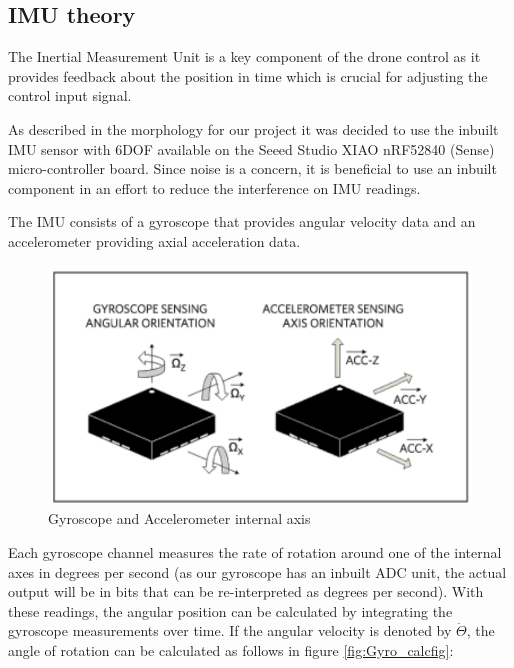 \subsection{IMU theory}

The Inertial Measurement Unit is a key component of the drone control as it provides feedback about the position in time which is crucial for adjusting the control input signal.

As described in the morphology for our project it was decided to use the inbuilt IMU sensor with 6DOF available on the Seeed Studio XIAO nRF52840 (Sense) micro-controller board. Since noise is a concern, it is beneficial to use an inbuilt component in an effort to reduce the interference on IMU readings.

The IMU consists of a gyroscope that provides angular velocity
data and an accelerometer providing axial acceleration data.

\begin{figure}[H]
    \begin{center}
    \includegraphics[scale = 0.5]{pictures/IMU/Gyro.png}
    \end{center}
    \caption{Gyroscope and Accelerometer internal axis \cite{IMU_basics}}
    \label{fig:my_label}
\end{figure}


Each gyroscope channel measures the rate of rotation around one of the internal axes in degrees per second (as our gyroscope has an inbuilt ADC unit, the actual output will be in bits that can be re-interpreted as degrees per second). With these readings, the angular position can be calculated by integrating the gyroscope measurements over time. If the angular velocity is denoted by $\dot{\Theta}$, the angle of rotation can be calculated as follows in figure \ref{fig:Gyro_calcfig}\cite{cf}:

